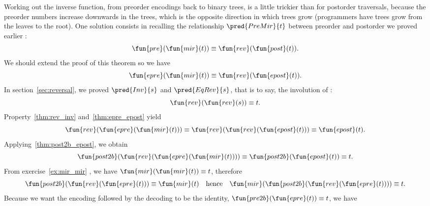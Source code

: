 Working out the inverse function, from preorder encodings back to
binary trees, is a little trickier than for postorder traversals,
because the preorder numbers increase downwards in the trees, which is
the opposite direction in which trees grow (programmers have trees
grow from the leaves to the root). One solution consists in recalling
the relationship \(\pred{PreMir}{t}\)
between preorder and postorder we proved earlier
:
\begin{equation*}
\abovedisplayskip=7pt
\belowdisplayskip=7pt
\fun{pre}(\fun{mir}(t)) \equiv \fun{rev}(\fun{post}(t)).
\end{equation*}
We should extend the proof of this theorem so we have
\begin{equation}
\abovedisplayskip=7pt
\belowdisplayskip=7pt
\fun{epre}(\fun{mir}(t)) \equiv \fun{rev}(\fun{epost}(t)).
\label{thm:epre_epost}
\index{rev@\fun{rev/1}}
\end{equation}
In section~\ref{sec:reversal}, we proved
\(\pred{Inv}{s}\) and
\(\pred{EqRev}{s}\), that is to say, the
involution of
:
\begin{equation}
\abovedisplayskip=7pt
\belowdisplayskip=7pt
\fun{rev}(\fun{rev}(s)) \equiv t.
\label{thm:rev_inv}
\end{equation}
Property~\eqref{thm:rev_inv} and~\eqref{thm:epre_epost} yield
\begin{equation*}
\abovedisplayskip=7pt
\belowdisplayskip=7pt
\fun{rev}(\fun{epre}(\fun{mir}(t))) \equiv
\fun{rev}(\fun{rev}(\fun{epost}(t))) \equiv \fun{epost}(t).
\end{equation*}
Applying~\eqref{thm:post2b_epost}, we obtain
\begin{equation*}
\abovedisplayskip=7pt
\belowdisplayskip=7pt
\fun{post2b}(\fun{rev}(\fun{epre}(\fun{mir}(t)))) \equiv
\fun{post2b}(\fun{epost}(t)) \equiv t.
\end{equation*}
From exercise~\ref{ex:mir_mir} , we have
\(\fun{mir}(\fun{mir}(t)) \equiv t\), therefore
\begin{equation*}
\abovedisplayskip=7pt
\belowdisplayskip=7pt
\fun{post2b}(\fun{rev}(\fun{epre}(t))) \equiv \fun{mir}(t)
\quad\text{hence}\quad
\fun{mir}(\fun{post2b}(\fun{rev}(\fun{epre}(t)))) \equiv t.
\end{equation*}
Because we want the encoding followed by the decoding to be the
identity, \(\fun{pre2b}(\fun{epre}(t)) \equiv t\), we have
